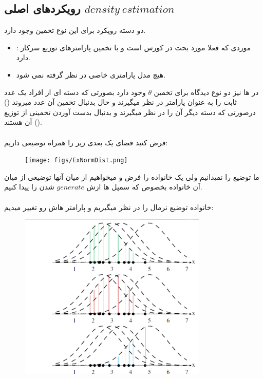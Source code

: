 \documentclass[12pt]{article}
\begin{document}
\subsection*{رویکردهای اصلی $density\:estimation$}
دو دسته رویکرد برای این نوع تخمین وجود دارد.
\begin{itemize}
    \item {}:
    موردی که فعلا مورد بحث در کورس است و با تخمین پارامترهای توزیع سرکار دارد.
    \item {} هیچ مدل پارامتری خاصی در نظر گرفته نمی شود.
\end{itemize}
در 
ها نیز دو نوع دیدگاه برای تخمین 
$\theta$
وجود دارد بصورتی که دسته ای از افراد یک عدد ثابت را به عنوان پارامتر در نظر میگیرند و حال بدنبال تخمین آن عدد میروند
()
درصورتی که دسته دیگر آن را 
در نظر میگیرند و بدنبال بدست آوردن تخمینی از توزیع آن هستند
().
\\
\\
فرض کنید فضای یک بعدی زیر را همراه توضیعی داریم:
\begin{figure}[h]
    \centering
    \texttt{[image: figs/ExNormDist.png]}
    \label{fig:your_label}
\end{figure}

ما توضیع را نمیدانیم ولی یک خانواده را فرض و میخواهیم از میان آنها توضیعی از میان آن خانواده بخصوص که سمپل ها ازش $generate$ شدن را پیدا کنیم.
\\
\\
خانواده توضیع نرمال را در نظر میگیریم و پارامتر هاش رو تغییر میدیم:

\begin{figure}[h]
    \centering
    \includegraphics[width=0.8\textwidth]{figs/normalDistMLE.png}
    \label{fig:your_label}
\end{figure}
\end{document}
